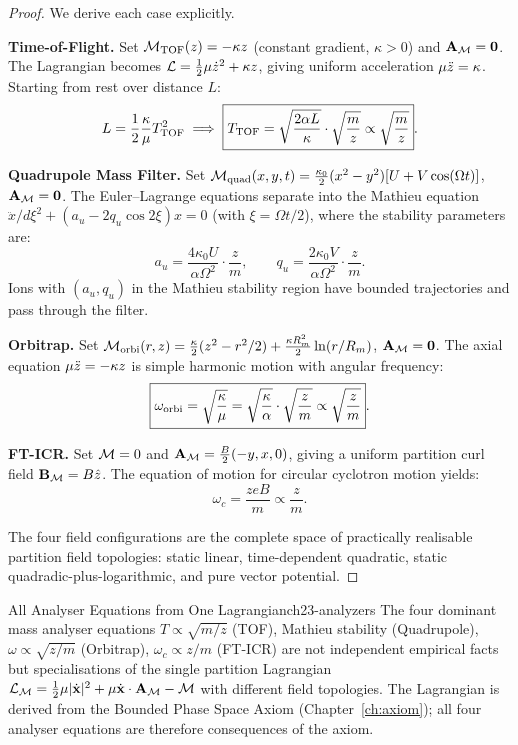 \begin{proof}
We derive each case explicitly.

\medskip
\noindent\textbf{Time-of-Flight.}
Set $\mathcal{M}_{\mathrm{TOF}}(z) = -\kappa z$ (constant gradient,
$\kappa > 0$) and $\mathbf{A}_{\mathcal{M}} = \mathbf{0}$.  The Lagrangian becomes
$\mathcal{L} = \frac{1}{2}\mu\dot{z}^2 + \kappa z$, giving uniform
acceleration $\mu\ddot{z} = \kappa$.  Starting from rest over
distance $L$:
\[
  L = \frac{1}{2}\frac{\kappa}{\mu}T_{\mathrm{TOF}}^2
  \implies
  \boxed{T_{\mathrm{TOF}} = \sqrt{\frac{2\alpha L}{\kappa}}\cdot\sqrt{\frac{m}{z}}
  \propto \sqrt{\frac{m}{z}}}.
\]

\medskip
\noindent\textbf{Quadrupole Mass Filter.}
Set $\mathcal{M}_{\mathrm{quad}}(x,y,t) = \frac{\kappa_0}{2}(x^2-y^2)
[U + V\cos(\Omega t)]$, $\mathbf{A}_{\mathcal{M}} = \mathbf{0}$.  The Euler--Lagrange
equations separate into the Mathieu equation
$\ddot{x}/d\xi^2 + (a_u - 2q_u\cos 2\xi)x = 0$ (with $\xi = \Omega t/2$),
where the stability parameters are:
\[
  \boxed{a_u = \frac{4\kappa_0 U}{\alpha\Omega^2}\cdot\frac{z}{m},
  \qquad
  q_u = \frac{2\kappa_0 V}{\alpha\Omega^2}\cdot\frac{z}{m}}.
\]
Ions with $(a_u, q_u)$ in the Mathieu stability region have bounded
trajectories and pass through the filter.

\medskip
\noindent\textbf{Orbitrap.}
Set $\mathcal{M}_{\mathrm{orbi}}(r,z) = \frac{\kappa}{2}(z^2 - r^2/2) +
\frac{\kappa R_m^2}{2}\ln(r/R_m)$, $\mathbf{A}_{\mathcal{M}} = \mathbf{0}$.
The axial equation $\mu\ddot{z} = -\kappa z$ is simple harmonic motion
with angular frequency:
\[
  \boxed{\omega_{\mathrm{orbi}} = \sqrt{\frac{\kappa}{\mu}}
  = \sqrt{\frac{\kappa}{\alpha}}\cdot\sqrt{\frac{z}{m}}
  \propto \sqrt{\frac{z}{m}}}.
\]

\medskip
\noindent\textbf{FT-ICR.}
Set $\mathcal{M} = 0$ and $\mathbf{A}_{\mathcal{M}} = \frac{B}{2}(-y, x, 0)$, giving a uniform
partition curl field $\mathbf{B}_{\mathcal{M}} = B\hat{z}$.  The equation of motion
for circular cyclotron motion yields:
\[
  \boxed{\omega_c = \frac{zeB}{m} \propto \frac{z}{m}}.
\]

The four field configurations are the complete space of practically realisable
partition field topologies: static linear, time-dependent quadratic, static
quadradic-plus-logarithmic, and pure vector potential.
\end{proof}

\begin{consequence}{All Analyser Equations from One Lagrangian}{ch23-analyzers}
The four dominant mass analyser equations
$T \propto \sqrt{m/z}$ (TOF),
Mathieu stability (Quadrupole),
$\omega \propto \sqrt{z/m}$ (Orbitrap),
$\omega_c \propto z/m$ (FT-ICR)
are not independent empirical facts but specialisations of the single partition
Lagrangian $\mathcal{L}_{\mathcal{M}} = \frac{1}{2}\mu|\dot{\mathbf{x}}|^2 +
\mu\dot{\mathbf{x}} \cdot \mathbf{A}_{\mathcal{M}} - \mathcal{M}$ with different field
topologies.  The Lagrangian is derived from the Bounded Phase Space Axiom
(Chapter~\ref{ch:axiom}); all four analyser equations are therefore
consequences of the axiom.
\end{consequence}

